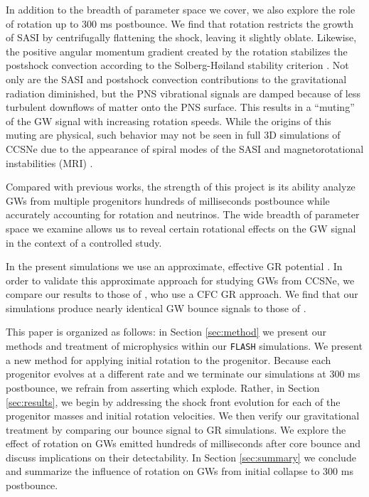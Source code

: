\documentclass[twocolumn,times]{aastex62}  %
\begin{document}
In addition to the breadth of parameter space we cover, we also explore the role of rotation up to 300 ms postbounce.  
We find that rotation restricts the growth of SASI by centrifugally flattening the shock, leaving it slightly oblate. Likewise, the positive angular momentum gradient created by the rotation stabilizes the postshock convection according to the Solberg-H{\o}iland stability criterion \citep{endal:1978,fryer:2000}.  Not only are the SASI and postshock convection contributions to the gravitational radiation diminished, but the PNS vibrational signals are damped because of less turbulent downflows of matter onto the PNS surface.  
This results in a ``muting'' of the GW signal with increasing rotation speeds.
While the origins of this muting are physical, such behavior may not be seen in full 3D simulations of CCSNe due to the appearance of spiral modes of the SASI and magnetorotational instabilities (MRI) \citep{cerda-duran:2007,andresen:2019} . 

Compared with previous works, the strength of this project is its ability analyze GWs from multiple progenitors hundreds of milliseconds postbounce while accurately accounting for rotation and neutrinos.  The wide breadth of parameter space we examine allows us to reveal certain rotational effects on the GW signal in the context of a controlled study.

In the present simulations we use an approximate, effective GR potential \citep{marek:2006,oconnor:2018}.
In order to validate this approximate approach for studying GWs from CCSNe, we compare our results to those of \citet{richers:2017}, who use a CFC GR approach.  We find that our simulations produce nearly identical GW bounce signals to those of \citet{richers:2017}.  

This paper is organized as follows:  in Section \ref{sec:method} we present our methods and treatment of microphysics within our \texttt{FLASH} simulations.  We present a new method for applying initial rotation to the progenitor.  Because each progenitor evolves at a different rate and we terminate our simulations at 300 ms postbounce, we refrain from asserting which explode.  Rather, in Section \ref{sec:results}, we begin by addressing the shock front evolution for each of the progenitor masses and initial rotation velocities.  We then verify our gravitational treatment by comparing our bounce signal to GR simulations.  We explore the effect of rotation on GWs emitted hundreds of milliseconds after core bounce and discuss implications on their detectability.  In Section \ref{sec:summary} we conclude and summarize the influence of rotation on GWs from initial collapse to 300 ms postbounce. 
\end{document}

